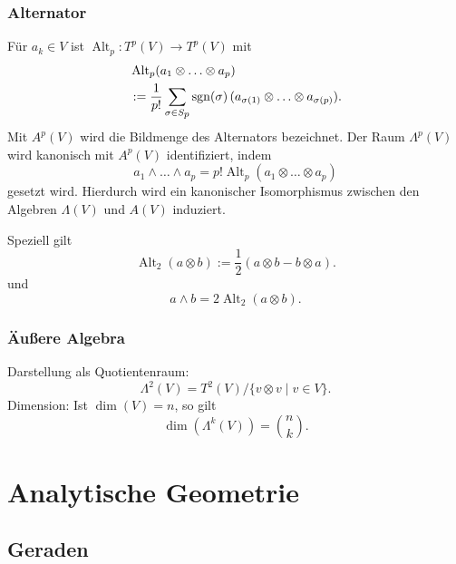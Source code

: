 \subsubsection{Alternator}
Für $a_k\in V$ ist
$\operatorname{Alt}_p\colon T^p(V)\to T^p(V)$
mit
\begin{equation}
\begin{split}
& \operatorname{Alt}_p (a_1\otimes\ldots\otimes a_p)\\
&:= \frac{1}{p!}\sum_{\sigma\in S_{\scriptstyle p}}
\operatorname*{sgn}(\sigma)\,(a_{\sigma(1)}\otimes\ldots\otimes a_{\sigma(p)}).
\end{split}
\end{equation}
Mit $A^p(V)$ wird die Bildmenge des Alternators bezeichnet.
Der Raum $\Lambda^p(V)$ wird kanonisch mit $A^p(V)$ identifiziert, indem
\begin{equation}
a_1\wedge\ldots\wedge a_p
= p!\operatorname{Alt}_p(a_1\otimes\ldots\otimes a_p)
\end{equation}
gesetzt wird. Hierdurch wird ein kanonischer Isomorphismus%
 zwischen
den Algebren $\Lambda(V)$ und $A(V)$ induziert.

Speziell gilt
\begin{equation}
\operatorname{Alt}_2 (a\otimes b) := \frac{1}{2}(a\otimes b-b\otimes a).
\end{equation}
und
\begin{equation}
a\wedge b = 2\operatorname{Alt}_2(a\otimes b).
\end{equation}

\subsubsection{Äußere Algebra}
Darstellung als Quotientenraum:
\begin{equation}
\Lambda^2(V) = T^2(V)/\{v\otimes v\mid v\in V\}.
\end{equation}
Dimension: Ist $\dim(V)=n$, so gilt
\begin{equation}
\dim(\Lambda^k(V)) = \binom{n}{k}.
\end{equation}

\clearpage
\section{Analytische Geometrie}
\subsection{Geraden}

